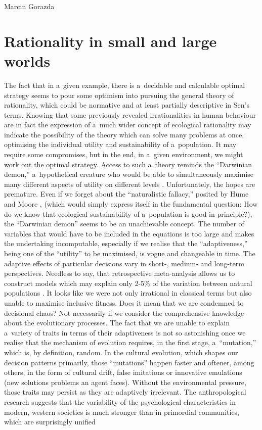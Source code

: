 \begin{artengenv}{Marcin Gorazda}
\section*{Rationality in small and large worlds}
The fact that in a~given example, there is a~decidable and calculable optimal strategy seems to pour some optimism into pursuing the general theory of rationality, which could be normative and at least partially descriptive in Sen's terms. Knowing that some previously revealed irrationalities in human behaviour are in fact the expression of a~much wider concept of ecological rationality may indicate the possibility of the theory which can solve many problems at once, optimising the individual utility and sustainability of a~population. It may require some compromises, but in the end, in a~given environment, we might work out the optimal strategy. Access to such a~theory reminds the ``Darwinian demon,'' a~hypothetical creature who would be able to simultaneously maximise many different aspects of utility on different levels
\parencite[][]{law_optimal_1979}. %
 Unfortunately, the hopes are premature. Even if we forget about the ``naturalistic fallacy,'' posited by Hume 
\parencite*[][]{hume_treatise_2000} %
 and Moore 
\parencite*[][]{moore_principia_2004}, %
 (which would simply express itself in the fundamental question: How do we know that ecological sustainability of a~population is good in principle?), the ``Darwinian demon'' seems to be an unachievable concept. The number of variables that would have to be included in the equations is too large and makes the undertaking incomputable, especially if we realise that the ``adaptiveness,'' being one of the ``utility'' to be maximised, is vogue and changeable in time. The adaptive effects of particular decisions vary in short-, medium- and long-term perspectives. Needless to say, that retrospective meta-analysis allows us to construct models which may explain only 2-5\% of the variation between natural populations 
\parencite[][]{mouden_what_2012}. %
 It looks like we were not only irrational in classical terms but also unable to maximise inclusive fitness. Does it mean that we are condemned to decisional chaos? Not necessarily if we consider the comprehensive knowledge about the evolutionary processes. The fact that we are unable to explain a~variety of traits in terms of their adaptiveness is not so astonishing once we realise that the mechanism of evolution requires, in the first stage, a~``mutation,'' which is, by definition, random. In the cultural evolution, which shapes our decision patterns primarily, those ``mutations'' happen faster and oftener, among others, in the form of cultural drift, false imitations or innovative emulations (new solutions problems an agent faces). Without the environmental pressure, those traits may persist as they are adaptively irrelevant. The anthropological research suggests that the variability of the psychological characteristics in modern, western societies is much stronger than in primordial communities, which are surprisingly unified 

\end{artengenv}

